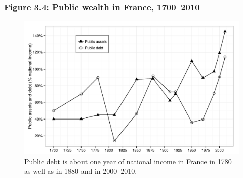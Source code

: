 \documentclass[t]{beamer}\usepackage[]{graphicx}\usepackage[]{color}
\newenvironment{knitrout}{}{} %
\begin{document}
\begin{frame}[label=Figure_3_4]
\frametitle{Figure 3.4: Public wealth in France, 1700--2010}
\begin{figure}[t]
\begin{minipage}[b]{\textwidth}
\centering
\begin{knitrout}\footnotesize
{}\color{fgcolor}

{\centering \includegraphics[width=1\linewidth]{figures/bw/Figure_3_4} 

}



\end{knitrout}
\caption{Public debt is about one year of national income in France in 1780 as well as in 1880 and in 2000--2010.}
\end{minipage}
\end{figure}
\end{frame}
\end{document}

